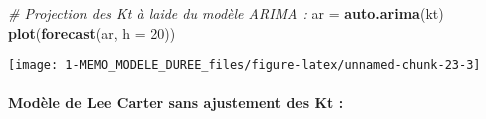 \documentclass[
]{article}
\newenvironment{Shaded}{\begin{snugshade}}{\end{snugshade}}
\newcommand{\AttributeTok}[1]{\textcolor[rgb]{0.13,0.29,0.53}{#1}}
\newcommand{\CommentTok}[1]{\textcolor[rgb]{0.56,0.35,0.01}{\textit{#1}}}
\newcommand{\DecValTok}[1]{\textcolor[rgb]{0.00,0.00,0.81}{#1}}
\newcommand{\DocumentationTok}[1]{\textcolor[rgb]{0.56,0.35,0.01}{\textbf{\textit{#1}}}}
\newcommand{\FloatTok}[1]{\textcolor[rgb]{0.00,0.00,0.81}{#1}}
\newcommand{\FunctionTok}[1]{\textcolor[rgb]{0.13,0.29,0.53}{\textbf{#1}}}
\newcommand{\NormalTok}[1]{#1}
\newcommand{\OtherTok}[1]{\textcolor[rgb]{0.56,0.35,0.01}{#1}}
\newcommand{\SpecialCharTok}[1]{\textcolor[rgb]{0.81,0.36,0.00}{\textbf{#1}}}
\newcommand{\StringTok}[1]{\textcolor[rgb]{0.31,0.60,0.02}{#1}}
\begin{document}
\begin{Shaded}
\begin{Highlighting}[]
\CommentTok{\# Projection des Kt à l\textquotesingle{}aide du modèle ARIMA : }
\NormalTok{ar }\OtherTok{=} \FunctionTok{auto.arima}\NormalTok{(kt)}
\FunctionTok{plot}\NormalTok{(}\FunctionTok{forecast}\NormalTok{(ar, }\AttributeTok{h =} \DecValTok{20}\NormalTok{))}
\end{Highlighting}
\end{Shaded}

\begin{center}\texttt{[image: 1-MEMO\_MODELE\_DUREE\_files/figure-latex/unnamed-chunk-23-3]} \end{center}

\hypertarget{moduxe8le-de-lee-carter-sans-ajustement-des-kt}{%
\paragraph{Modèle de Lee Carter sans ajustement des Kt
:}\label{moduxe8le-de-lee-carter-sans-ajustement-des-kt}}

\begin{Shaded}
\end{Shaded}
\end{document}
